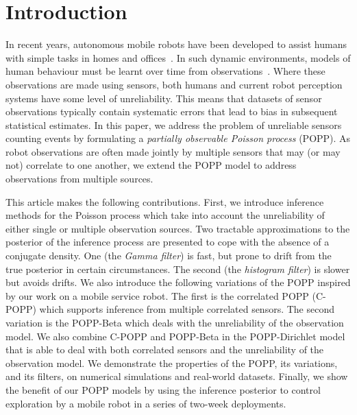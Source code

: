 

\section{Introduction}
\label{sec:introduction}

In recent years, autonomous mobile robots have been developed to assist humans with simple tasks in homes and offices~\cite{hawes2016strands}. In such dynamic environments, models of human behaviour must be learnt over time from observations~\cite{coppola2016learning}. Where these observations are made using sensors, both humans and current robot perception systems have some level of unreliability. This means that datasets of sensor observations typically contain systematic errors that lead to bias in subsequent statistical estimates. In this paper, we address the problem of unreliable sensors counting events by formulating a \textit{partially observable Poisson process} (POPP). As robot observations are often made jointly by multiple sensors that may (or may not) correlate to one another, we extend the POPP model to address observations from multiple sources. 

This article makes the following contributions. First, we introduce inference methods for the Poisson process which take into account the unreliability of either single or multiple observation sources. Two tractable approximations to the posterior of the inference process are presented to cope with the absence of a conjugate density. One (the \textit{Gamma filter}) is fast, but prone to drift from the true posterior in certain circumstances. The second (the \textit{histogram filter}) is slower but avoids drifts. We also introduce the following variations of the POPP inspired by our work on a mobile service robot. The first is the correlated POPP (C-POPP) which supports inference from multiple correlated sensors. The second variation is the POPP-Beta which deals with the unreliability of the observation model. We also combine C-POPP and POPP-Beta in the POPP-Dirichlet model that is able to deal with both correlated sensors and the unreliability of the observation model. We demonstrate the properties of the POPP, its variations, and its filters, on numerical simulations and real-world datasets.
% 
Finally, we show the benefit of our POPP models by using the inference posterior to control exploration by a mobile robot in a series of two-week deployments. 
% 

